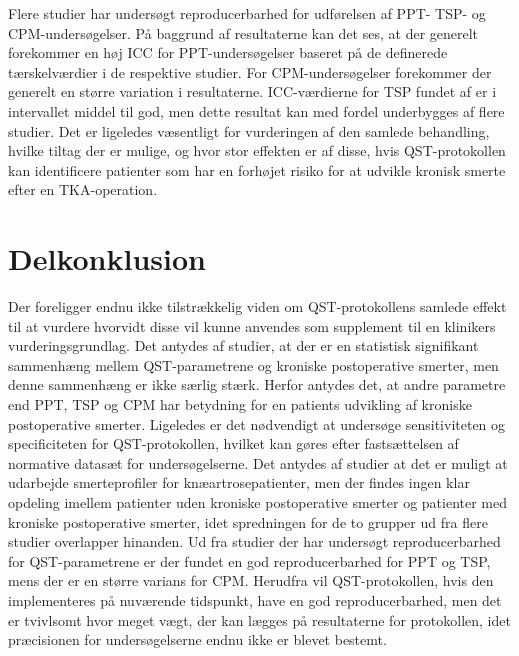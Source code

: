 Flere studier har undersøgt reproducerbarhed for udførelsen af PPT- TSP- og CPM-undersøgelser. På baggrund af resultaterne kan det ses, at der generelt forekommer en høj ICC for PPT-undersøgelser baseret på de definerede tærskelværdier i de respektive studier. For CPM-undersøgelser forekommer der generelt en større variation i resultaterne. ICC-værdierne for TSP fundet af  er i intervallet middel til god, men dette resultat kan med fordel underbygges af flere studier. 
Det er ligeledes væsentligt for vurderingen af den samlede behandling, hvilke tiltag der er mulige, og hvor stor effekten er af disse, hvis QST-protokollen kan identificere patienter som har en forhøjet risiko for at udvikle kronisk smerte efter en TKA-operation.

\section{Delkonklusion}
Der foreligger endnu ikke tilstrækkelig viden om QST-protokollens samlede effekt til at vurdere hvorvidt disse vil kunne anvendes som supplement til en klinikers vurderingsgrundlag. Det antydes af studier, at der er en statistisk signifikant sammenhæng mellem QST-parametrene og kroniske postoperative smerter, men denne sammenhæng er ikke særlig stærk. Herfor antydes det, at andre parametre end PPT, TSP og CPM har betydning for en patients udvikling af kroniske postoperative smerter. Ligeledes er det nødvendigt at undersøge sensitiviteten og specificiteten for QST-protokollen, hvilket kan gøres efter fastsættelsen af normative datasæt for undersøgelserne. Det antydes af studier at det er muligt at udarbejde smerteprofiler for knæartrosepatienter, men der findes ingen klar opdeling imellem patienter uden kroniske postoperative smerter og patienter med kroniske postoperative smerter, idet spredningen for de to grupper ud fra flere studier overlapper hinanden. Ud fra studier der har undersøgt reproducerbarhed for QST-parametrene er der fundet en god reproducerbarhed for PPT og TSP, mens der er en større varians for CPM. Herudfra vil QST-protokollen, hvis den implementeres på nuværende tidspunkt, have en god reproducerbarhed, men det er tvivlsomt hvor meget vægt, der kan lægges på resultaterne for protokollen, idet præcisionen for undersøgelserne endnu ikke er blevet bestemt.

